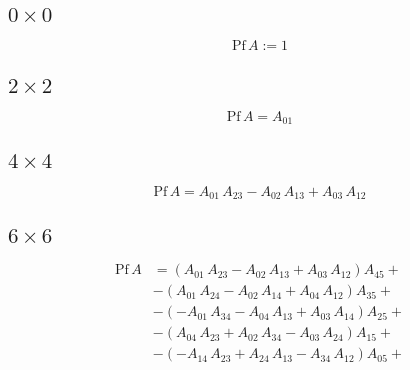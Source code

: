 \documentclass{article}
\begin{document}
\subsection{$0\times 0$}
$$
\text{Pf}\,A :=1
$$
\subsection{$2\times 2$}
$$
\text{Pf}\,A = A_{01}
$$
\subsection{$4\times 4$}
$$
\text{Pf}\,A = A_{01}\,A_{23}-A_{02}\,A_{13}+A_{03}\,A_{12}
$$
\subsection{$6\times 6$}
\begin{equation*}
  \begin{split}
    \text{Pf}\,A &= \left(A_{01}\,A_{23}-A_{02}\,A_{13}+A_{03}\,A_{12}\right)A_{45}+\\
    &-\left(A_{01}\,A_{24}-A_{02}\,A_{14}+A_{04}\,A_{12}\right)A_{35}+\\
    &-\left(-A_{01}\,A_{34}-A_{04}\,A_{13}+A_{03}\,A_{14}\right)A_{25}+\\
    &-\left(A_{04}\,A_{23}+A_{02}\,A_{34}-A_{03}\,A_{24}\right)A_{15}+\\
    &-\left(-A_{14}\,A_{23}+A_{24}\,A_{13}-A_{34}\,A_{12}\right)A_{05}+\\
  \end{split}
  \end{equation*}
\end{document}
